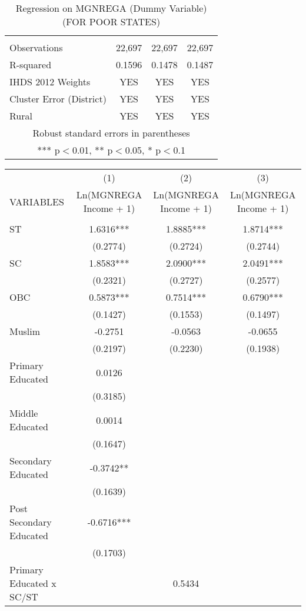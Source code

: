 \documentclass{article}
\begin{document}
\begin{table}[]
\begin{tabular}{lccc}
 &  &  &  \\
Observations & 22,697 & 22,697 & 22,697 \\
 R-squared & 0.1596 & 0.1478 & 0.1487 \\
IHDS 2012 Weights & YES & YES & YES \\
Cluster Error (District) & YES & YES & YES \\
Rural & YES & YES & YES \\ \hline
\multicolumn{4}{c}{ Robust standard errors in parentheses} \\
\multicolumn{4}{c}{ *** p$<$0.01, ** p$<$0.05, * p$<$0.1} \\\hline
\end{tabular}
    \caption{Regression on MGNREGA (Dummy Variable) (FOR POOR STATES)}
    \label{tab6}
\end{table}
\begin{landscape}
\begin{table}[]
\small
    \centering
    \begin{tabular}{lccc} \hline
 & (1) & (2) & (3) \\
VARIABLES & Ln(MGNREGA Income + 1) & Ln(MGNREGA Income + 1) & Ln(MGNREGA Income + 1) \\ \hline\hline
 &  &  &  \\
ST & 1.6316*** & 1.8885*** & 1.8714*** \\
 & (0.2774) & (0.2724) & (0.2744) \\
SC & 1.8583*** & 2.0900*** & 2.0491*** \\
 & (0.2321) & (0.2727) & (0.2577) \\
OBC & 0.5873*** & 0.7514*** & 0.6790*** \\
 & (0.1427) & (0.1553) & (0.1497) \\
Muslim & -0.2751 & -0.0563 & -0.0655 \\
 & (0.2197) & (0.2230) & (0.1938) \\
Primary Educated & 0.0126 &  &  \\
 & (0.3185) &  &  \\
Middle Educated & 0.0014 &  &  \\
 & (0.1647) &  &  \\
Secondary Educated & -0.3742** &  &  \\
 & (0.1639) &  &  \\
Post Secondary Educated & -0.6716*** &  &  \\
 & (0.1703) &  &  \\
Primary Educated x SC/ST &  & 0.5434 &  \\

\end{tabular}
\end{table}
\end{landscape}
\end{document}
